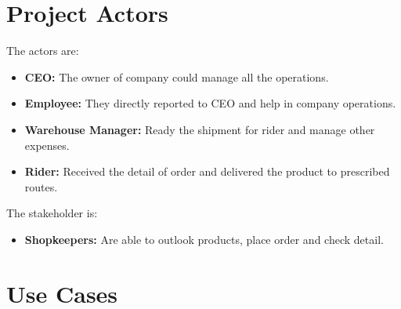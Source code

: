 \documentclass[12pt,a4paper]{report}
\begin{document}
\chapter {Project Actors}
The actors are:
\begin{itemize}
\item \textbf{ CEO:} The owner of company could manage all the operations.
\item \textbf{Employee:} They directly reported to CEO and help in company operations.    
\item \textbf{Warehouse Manager:} Ready the shipment for rider and manage other expenses. 
\item \textbf{Rider:} Received the detail of order and delivered the product to prescribed routes.  
\end{itemize}
The stakeholder is:
\begin{itemize}
\item \textbf{Shopkeepers:} Are able to outlook products, place order and check detail.
\end{itemize}
\newpage
\chapter {Use Cases}
\end{document}
